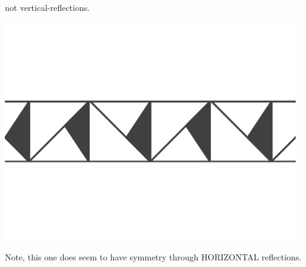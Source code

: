 \documentclass[noauthor,nooutcomes,12pt,hints,handout]{ximera}
\begin{document}
\begin{question}
\begin{freeResponse}
\begin{enumerate}
      not vertical-reflections.
        \begin{center}
          \includegraphics[width=.6\textwidth]{ansGR.png}
        \end{center}
        Note, this one does seem to have symmetry through HORIZONTAL
        reflections.
    \end{enumerate}
  \end{freeResponse}
\end{question}
\end{document}

